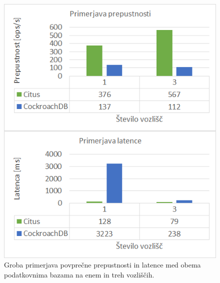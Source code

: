 \documentclass[a4paper, 12pt]{book}
\begin{document}
\newpage

\begin{figure}[H]
    \begin{center}
    \includegraphics[width=1\textwidth]{resources/top-level-comparison.png}
    \end{center}
    \caption{Groba primerjava povprečne prepustnosti in latence med obema podatkovnima bazama na enem in treh vozliščih.}
    \label{img_ycsb_results_top_level_comparison}
    \end{figure}

\newpage
\end{document}
